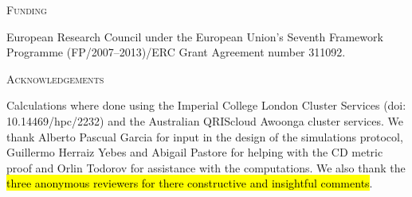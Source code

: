 \documentclass[12pt,letterpaper]{article}
\renewcommand{\section}[1]{%
\bigskip
\begin{center}
\begin{Large}
\normalfont\scshape #1
\medskip
\end{Large}
\end{center}}
\begin{document}
\section{Funding}
European Research Council under the European Union’s Seventh Framework Programme (FP/2007–2013)/ERC Grant Agreement number 311092.

\section{Acknowledgements}
Calculations where done using the Imperial College London Cluster Services (doi: 10.14469/hpc/2232) and the Australian QRIScloud Awoonga cluster services. We thank Alberto Pascual Garcia for input in the design of the simulations protocol, Guillermo Herraiz Yebes and Abigail Pastore for helping with the CD metric proof and Orlin Todorov for assistance with the computations. We also thank the \hl{three anonymous reviewers for there constructive and insightful comments}.



\end{document}
